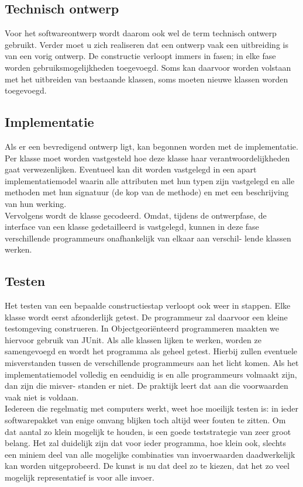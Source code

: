 \documentclass{article}
\begin{document}
	\subsection{Technisch ontwerp}
	
	Voor het softwareontwerp wordt daarom ook wel de term technisch ontwerp gebruikt.
	Verder moet u zich realiseren dat een ontwerp vaak een uitbreiding is
	van een vorig ontwerp. De constructie verloopt immers in fasen; in elke
	fase worden gebruiksmogelijkheden toegevoegd. Soms kan daarvoor
	worden volstaan met het uitbreiden van bestaande klassen, soms moeten
	nieuwe klassen worden toegevoegd.
	
	\subsection{Implementatie}
	
	Als er een bevredigend ontwerp ligt, kan begonnen worden met de
	implementatie. Per klasse moet worden vastgesteld hoe deze klasse haar
	verantwoordelijkheden gaat verwezenlijken. Eventueel kan dit worden
	vastgelegd in een apart implementatiemodel waarin alle attributen met
	hun typen zijn vastgelegd en alle methoden met hun signatuur (de kop
	van de methode) en met een beschrijving van hun werking. \\
	Vervolgens wordt de klasse gecodeerd. Omdat, tijdens de ontwerpfase,
	de interface van een klasse gedetailleerd is vastgelegd, kunnen in deze
	fase verschillende programmeurs onafhankelijk van elkaar aan verschil-
	lende klassen werken.
	
	\subsection{Testen}
	
	Het testen van een bepaalde constructiestap verloopt ook weer in stappen.
	Elke klasse wordt eerst afzonderlijk getest. De programmeur zal daarvoor
	een kleine testomgeving construeren. In Objectgeoriënteerd programmeren maakten we hiervoor gebruik van JUnit. Als alle klassen lijken te
	werken, worden ze samengevoegd en wordt het programma als geheel
	getest. Hierbij zullen eventuele misverstanden tussen de verschillende
	programmeurs aan het licht komen. Als het implementatiemodel volledig
	en eenduidig is en alle programmeurs volmaakt zijn, dan zijn die misver-
	standen er niet. De praktijk leert dat aan die voorwaarden vaak niet is
	voldaan. \\
	Iedereen die regelmatig met computers werkt, weet hoe moeilijk testen
	is: in ieder softwarepakket van enige omvang blijken toch altijd weer
	fouten te zitten. Om dat aantal zo klein mogelijk te houden, is een goede
	teststrategie van zeer groot belang. Het zal duidelijk zijn dat voor ieder
	programma, hoe klein ook, slechts een miniem deel van alle mogelijke
	combinaties van invoerwaarden daadwerkelijk kan worden uitgeprobeerd. De kunst is nu dat deel zo te kiezen, dat het zo veel mogelijk
	representatief is voor alle invoer.
	
\end{document}
